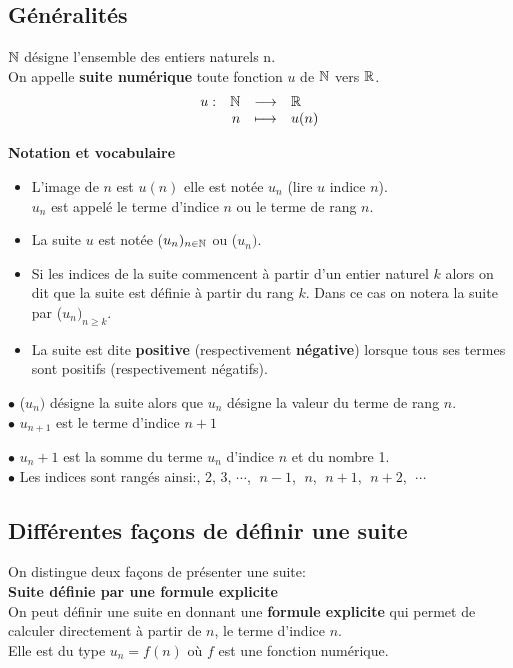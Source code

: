 \subsection*{Généralités}
\begin{definition}
$\mathbb{N}  $   désigne l'ensemble des entiers naturels n.\\
On appelle \textbf{ suite numérique } toute fonction  $u$  de  $\mathbb{N}  $  vers $ \mathbb{R} $.
    \[ \begin{array}{lrcl}
   u  : & \mathbb{N}  &   \longrightarrow & \mathbb{R} \\ 
  &  n & \longmapsto & u(n)
   \end{array}\]
   \end{definition}
 \textbf{Notation et vocabulaire} 
  \begin{itemize}
  \item[\textbullet]L'image de $n$ est $u(n)$ elle est notée  $u_{n} $ (lire $u$ indice $ n $).\\ $u_{n} $ est appelé le terme d'indice $ n $ ou le terme de rang $ n $.
  \item [\textbullet] La suite  $u$  est notée  ($u_{n})_{n\in\mathbb{N}}$ ou  ($u_{n})$.
 \item [\textbullet] Si les indices de la suite commencent à   partir d'un entier naturel $ k $ alors on dit que la suite est définie  à  partir du rang $ k $.\;
 Dans ce cas on notera la suite par  ($u_{n})_{n\geq k}$.
 \item [\textbullet] La suite est dite \textbf{ positive} (respectivement  \textbf{ négative}) lorsque tous ses termes sont positifs (respectivement négatifs).
 \end{itemize}

 \begin{methode}
 $\bullet$ ($u_{n} ) $ désigne la suite alors que  $u_{n} $ désigne la valeur du terme de rang $n$. \\   
 $\bullet$ $u_{n+1}$ est le terme d'indice $n+1$

 $\bullet$ $u_n+1$ est la somme du terme $u_n$ d'indice $n$ et du nombre 1.\\
$\bullet$   Les indices sont rangés ainsi:, 2, 3, $ \cdots $, $ \;{n-1}$,   $\; n $,  $\; {n+1} $,  $\; {n+2} $,   $\; \cdots $   
\end{methode}

\subsection*{Différentes façons de définir une suite} 
 On distingue deux façons de présenter une suite:\\
  \textbf{ Suite définie par une formule explicite }\\ 
On peut définir  une suite  en donnant une \textbf{formule explicite} qui permet de calculer directement à partir de $n$, le terme d'indice $n$. \\ Elle est du type  $u_{n} = f (n) $ où $f$ est une fonction numérique.

